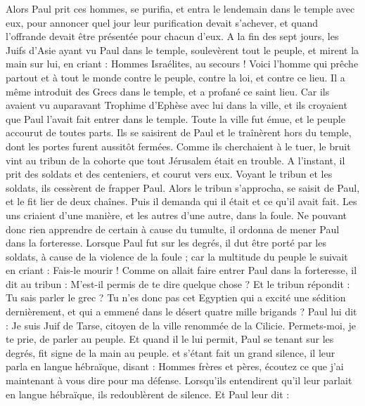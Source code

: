 \begin{multicols}{2}
Alors Paul prit ces hommes, se purifia, et entra le lendemain dans le temple avec eux, pour annoncer quel jour leur purification devait s'achever, et quand l’offrande devait être présentée pour chacun d’eux.
A la fin des sept jours, les Juifs d'Asie ayant vu Paul dans le temple, soulevèrent tout le peuple, et mirent la main sur lui,
en criant : Hommes Israélites, au secours ! Voici l’homme qui prêche partout et à tout le monde contre le peuple, contre la loi, et contre ce lieu. Il a même introduit des Grecs dans le temple, et a profané ce saint lieu.
Car ils avaient vu auparavant Trophime d’Ephèse avec lui dans la ville, et ils croyaient que Paul l'avait fait entrer dans le temple.
Toute la ville fut émue, et le peuple accourut de toutes parts. Ils se saisirent de Paul et le traînèrent hors du temple, dont les portes furent aussitôt fermées.
Comme ils cherchaient à le tuer, le bruit vint au tribun de la cohorte que tout Jérusalem était en trouble.
A l’instant, il prit des soldats et des centeniers, et courut vers eux. Voyant le tribun et les soldats, ils cessèrent de frapper Paul.
Alors le tribun s’approcha, se saisit de Paul, et le fit lier de deux chaînes. Puis il demanda qui il était et ce qu’il avait fait.
Les uns criaient d'une manière, et les autres d'une autre, dans la foule. Ne pouvant donc rien apprendre de certain à cause du tumulte, il ordonna de mener Paul dans la forteresse.
Lorsque Paul fut sur les degrés, il dut être porté par les soldats, à cause de la violence de la foule ;
car la multitude du peuple le suivait en criant : Fais-le mourir !
Comme on allait faire entrer Paul dans la forteresse, il dit au tribun : M’est-il permis de te dire quelque chose ? Et le tribun répondit : Tu sais parler le grec ?
Tu n’es donc pas cet Egyptien qui a excité une sédition dernièrement, et qui a emmené dans le désert quatre mille brigands ?
Paul lui dit : Je suis Juif de Tarse, citoyen de la ville renommée de la Cilicie. Permets-moi, je te prie, de parler au peuple.
Et quand il le lui permit, Paul se tenant sur les degrés, fit signe de la main au peuple. et s'étant fait un grand silence, il leur parla en langue hébraïque, disant :
\VerseOne{}Hommes frères et pères, écoutez ce que j’ai maintenant à vous dire pour ma défense.
Lorsqu’ils entendirent qu’il leur parlait en langue hébraïque, ils redoublèrent de silence. Et Paul leur dit :

\end{multicols}
